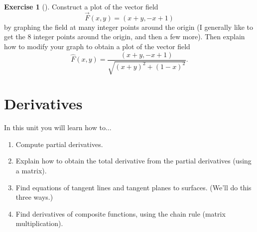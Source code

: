 \documentclass[10pt,]{book}
\theoremstyle{plain}
\theoremstyle{definition}
\theoremstyle{definition}
\theoremstyle{definition}
\theoremstyle{definition}
\newtheorem{exploration}[project]{Exercise}
\theoremstyle{definition}
\numberwithin{equation}{section}
\begin{document}
\begin{exploration}[]\label{exploration-130}
Construct a plot of the vector field%
\begin{equation*}
\vec F(x,y) = (x+y, -x+1)
\end{equation*}
by graphing the field at many integer points around the origin (I generally like to get the 8 integer points around the origin, and then a few more). Then explain how to modify your graph to obtain a plot of the vector field%
\begin{equation*}
\hat F(x,y) = \frac{(x+y, -x+1)}{\sqrt{(x+y)^2+(1-x)^2}}.
\end{equation*}
%
\end{exploration}
\typeout{************************************************}
\typeout{************************************************}
\chapter[{Derivatives}]{Derivatives}\label{chapter-7}
In this unit you will learn how to... \leavevmode%
\begin{enumerate}
\item\hypertarget{li-69}{}Compute partial derivatives.%
\item\hypertarget{li-70}{}Explain how to obtain the total derivative from the partial derivatives (using a matrix).%
\item\hypertarget{li-71}{}Find equations of tangent lines and tangent planes to surfaces. (We'll do this three ways.)%
\item\hypertarget{li-72}{}Find derivatives of composite functions, using the chain rule (matrix multiplication).%
\end{enumerate}
%
\typeout{************************************************}
\typeout{************************************************}
\end{document}
